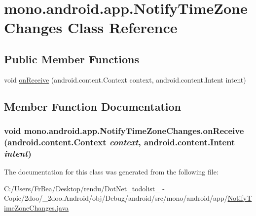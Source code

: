 \hypertarget{classmono_1_1android_1_1app_1_1_notify_time_zone_changes}{
\section{mono.android.app.NotifyTimeZoneChanges Class Reference}
\label{classmono_1_1android_1_1app_1_1_notify_time_zone_changes}
}
\subsection*{Public Member Functions}
\begin{CompactItemize}
\item 
void \hyperlink{classmono_1_1android_1_1app_1_1_notify_time_zone_changes_07a0e630ae667b83ee774709cc89f20b}{onReceive} (android.content.Context context, android.content.Intent intent)
\end{CompactItemize}


\subsection{Member Function Documentation}
\hypertarget{classmono_1_1android_1_1app_1_1_notify_time_zone_changes_07a0e630ae667b83ee774709cc89f20b}{
\subsubsection[{onReceive}]{\setlength{\rightskip}{0pt plus 5cm}void mono.android.app.NotifyTimeZoneChanges.onReceive (android.content.Context {\em context}, \/  android.content.Intent {\em intent})}}
\label{classmono_1_1android_1_1app_1_1_notify_time_zone_changes_07a0e630ae667b83ee774709cc89f20b}




The documentation for this class was generated from the following file:\begin{CompactItemize}
\item 
C:/Users/FrBea/Desktop/rendu/DotNet\_\-todolist\_ - Copie/2doo/\_\-2doo.Android/obj/Debug/android/src/mono/android/app/\hyperlink{_notify_time_zone_changes_8java}{NotifyTimeZoneChanges.java}\end{CompactItemize}
